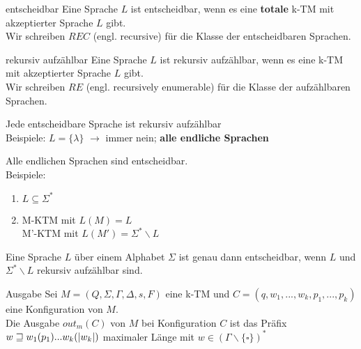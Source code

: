 \begin{defn}{entscheidbar}
    Eine Sprache $L$ ist entscheidbar, wenn es eine \textbf{totale} k-TM mit akzeptierter Sprache $L$ gibt.\\
    Wir schreiben $REC$ (engl. recursive) für die Klasse der entscheidbaren Sprachen. 
\end{defn}

\begin{defn}{rekursiv aufzählbar}
    Eine Sprache $L$ ist rekursiv aufzählbar, wenn es eine k-TM mit akzeptierter Sprache $L$ gibt. \\
    Wir schreiben $RE$ (engl. recursively enumerable) für die Klasse der aufzählbaren Sprachen.
\end{defn}

\begin{bem}
    Jede entscheidbare Sprache ist rekursiv aufzählbar\\
    Beispiele: $L=\{\lambda\}$ $\rightarrow$ immer nein; \textbf{alle endliche Sprachen}\\
\end{bem}

\begin{bem}
    Alle endlichen Sprachen sind entscheidbar.\\
    Beispiele:
    \begin{enumerate}
        \item $L \subseteq \Sigma^*$
        \item M-KTM mit $L(M)=L$ \\
              M'-KTM mit $L(M') = \Sigma^* \backslash L$
    \end{enumerate}
\end{bem}

\begin{bem}
    Eine Sprache $L$ über einem Alphabet $\Sigma$ ist genau dann entscheidbar, wenn $L$ und $\Sigma^*\backslash L$ rekursiv aufzählbar sind.
\end{bem}

\begin{defn}{Ausgabe}
    Sei $M = (Q, \Sigma, \Gamma, \Delta, s, F)$ eine k-TM und $C=(q,w_1,...,w_k,p_1,...,p_k)$ eine Konfiguration von $M$. \\

    Die Ausgabe $out_m(C)$ von $M$ bei Konfiguration $C$ ist das Präfix $w \sqsupseteq w_1(p_1)...w_k(|w_k|)$ maximaler Länge mit $w \in (\Gamma \backslash \{\square\})^*$
\end{defn}

